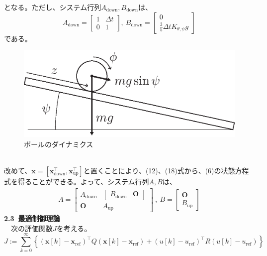 \documentclass[a4paper,10.5pt]{ltjsarticle}
\begin{document}
となる。ただし、システム行列$A_\mathrm{down},B_\mathrm{down}$は、
\begin{equation}
  A_\mathrm{down}=
  \begin{bmatrix}
    1&\Delta t\\
    0&1
  \end{bmatrix}
  ,\ B_\mathrm{down}=
  \begin{bmatrix}
    0\\
    \frac{3}{5}\Delta tK_{\theta,\psi}g
  \end{bmatrix}
\end{equation}
である。
\\
\begin{figure}[h]
  \centering
  \includegraphics[scale=0.9]{figure4.eps}
  \vspace{-35pt}\caption{ボールのダイナミクス}
  \label{fig:figure4}
\end{figure}
\\
改めて、$\bm x=[\bm x_\mathrm{down}^\top, \bm x_\mathrm{up}^\top]$と置くことにより、(12)、(18)式から、(6)の状態方程式を得ることができる。よって、システム行列$A,B$は、
\begin{align}
  A=
  \begin{bmatrix}
    A_\mathrm{down}&
    \begin{bmatrix}
      B_\mathrm{down}&\bm O
    \end{bmatrix}\\
    \bm O&A_\mathrm{up}
  \end{bmatrix}
  \ ,\ B=
  \begin{bmatrix}
    \bm O\\
    B_\mathrm{up}
  \end{bmatrix}
\end{align}
\clearpage
{\large \bfseries 2.3 最適制御理論}\\
　次の評価関数$J$を考える。
\begin{equation}
  J:=\sum_{k=0}^{\infty} \left\{(\bm x[k]-\bm x_\mathrm{ref})^\top Q(\bm x[k]-\bm x_\mathrm{ref})+(u[k]-u_\mathrm{ref})^\top R(u[k]-u_\mathrm{ref})\right\}
\end{equation}
\end{document}
